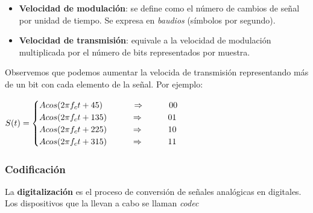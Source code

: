 \documentclass[]{article}
\begin{document}
\begin{itemize}
    \item \textbf{Velocidad de modulación}: se define como el número de cambios de señal por unidad de tiempo. Se expresa en \emph{baudios} (símbolos por segundo).
    \item \textbf{Velocidad de transmisión}: equivale a la velocidad de modulación multiplicada por el número de bits representados por muestra.
\end{itemize}

Observemos que podemos aumentar la velocida de transmisión representando más de un bit con cada elemento de la señal. Por ejemplo:
\begin{center}
    $S(t) = \begin{cases}
        A cos(2 \pi f_c t + 45)\ \hspace{1.1cm}\Rightarrow\hspace{1cm}00\\
        A cos(2 \pi f_c t + 135)\hspace{1cm}\Rightarrow\hspace{1cm}01\\
        A cos(2 \pi f_c t + 225)\hspace{1cm}\Rightarrow\hspace{1cm}10\\
        A cos(2 \pi f_c t + 315)\hspace{1cm}\Rightarrow\hspace{1cm}11
    \end{cases}$
\end{center}

\subsubsection{Codificación}
La \textbf{digitalización} es el proceso de conversión de señales analógicas en digitales. Los dispositivos que la llevan a cabo se llaman \emph{codec}

\end{document}
